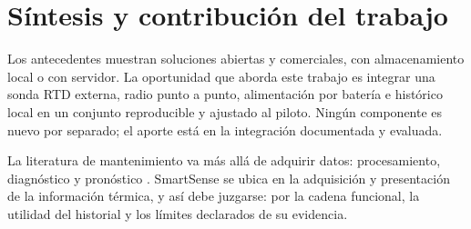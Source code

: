 \section{Síntesis y contribución del trabajo}
Los antecedentes muestran soluciones abiertas y comerciales, con almacenamiento local o con servidor. La oportunidad que aborda este trabajo es integrar una sonda RTD externa, radio punto a punto, alimentación por batería e histórico local en un conjunto reproducible y ajustado al piloto. Ningún componente es nuevo por separado; el aporte está en la integración documentada y evaluada.

La literatura de mantenimiento va más allá de adquirir datos: procesamiento, diagnóstico y pronóstico \citep{jardine2006,cinar2020}. SmartSense se ubica en la adquisición y presentación de la información térmica, y así debe juzgarse: por la cadena funcional, la utilidad del historial y los límites declarados de su evidencia.
